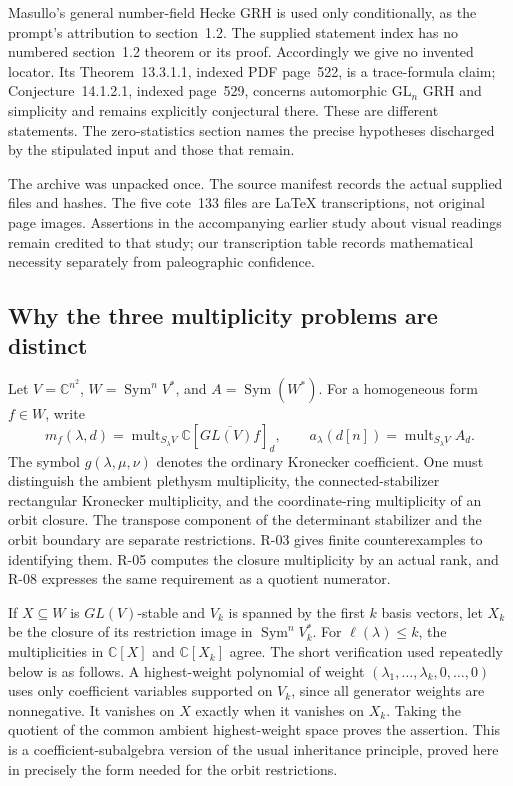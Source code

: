 Masullo's general number-field Hecke GRH is used only conditionally, as the prompt's attribution to section~1.2. The supplied statement index has no numbered section~1.2 theorem or its proof. Accordingly we give no invented locator. Its Theorem~13.3.1.1, indexed PDF page~522, is a trace-formula claim; Conjecture~14.1.2.1, indexed page~529, concerns automorphic $\mathrm{GL}_n$ GRH and simplicity and remains explicitly conjectural there. These are different statements. The zero-statistics section names the precise hypotheses discharged by the stipulated input and those that remain.

The archive was unpacked once. The source manifest records the actual supplied files and hashes. The five cote~133 files are LaTeX transcriptions, not original page images. Assertions in the accompanying earlier study about visual readings remain credited to that study; our transcription table records mathematical necessity separately from paleographic confidence.

\subsection{Why the three multiplicity problems are distinct}

Let $V=\mathbb C^{n^2}$, $W=\operatorname{Sym}^nV^*$, and $A=\operatorname{Sym}(W^*)$. For a homogeneous form $f\in W$, write
\[
 m_f(\lambda,d)=\operatorname{mult}_{S_\lambda V}\mathbb C[\overline{GL(V)f}]_d,
 \qquad a_\lambda(d[n])=\operatorname{mult}_{S_\lambda V}A_d.
\]
The symbol $g(\lambda,\mu,\nu)$ denotes the ordinary Kronecker coefficient. One must distinguish the ambient plethysm multiplicity, the connected-stabilizer rectangular Kronecker multiplicity, and the coordinate-ring multiplicity of an orbit closure. The transpose component of the determinant stabilizer and the orbit boundary are separate restrictions. R-03 gives finite counterexamples to identifying them. R-05 computes the closure multiplicity by an actual rank, and R-08 expresses the same requirement as a quotient numerator.

If $X\subseteq W$ is $GL(V)$-stable and $V_k$ is spanned by the first $k$ basis vectors, let $X_k$ be the closure of its restriction image in $\operatorname{Sym}^nV_k^*$. For $\ell(\lambda)\leq k$, the multiplicities in $\mathbb C[X]$ and $\mathbb C[X_k]$ agree. The short verification used repeatedly below is as follows. A highest-weight polynomial of weight $(\lambda_1,\ldots,\lambda_k,0,\ldots,0)$ uses only coefficient variables supported on $V_k$, since all generator weights are nonnegative. It vanishes on $X$ exactly when it vanishes on $X_k$. Taking the quotient of the common ambient highest-weight space proves the assertion. This is a coefficient-subalgebra version of the usual inheritance principle, proved here in precisely the form needed for the orbit restrictions.

